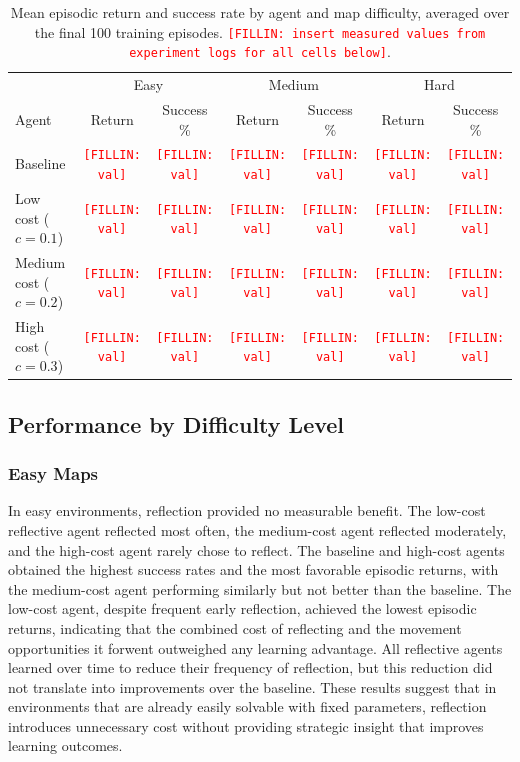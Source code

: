 \documentclass[11pt]{article}
\newcommand{\fillin}[1]{\textcolor{red}{\texttt{[FILLIN: #1]}}}
\begin{document}
\begin{table}[h]
\centering
\caption{Mean episodic return and success rate by agent and map difficulty, averaged over the final 100 training episodes. \fillin{insert measured values from experiment logs for all cells below}.}
\begin{tabular}{lcccccc}
\toprule
& \multicolumn{2}{c}{Easy} & \multicolumn{2}{c}{Medium} & \multicolumn{2}{c}{Hard} \\
Agent & Return & Success \% & Return & Success \% & Return & Success \% \\
\midrule
Baseline & \fillin{val} & \fillin{val} & \fillin{val} & \fillin{val} & \fillin{val} & \fillin{val} \\
Low cost ($c=0.1$) & \fillin{val} & \fillin{val} & \fillin{val} & \fillin{val} & \fillin{val} & \fillin{val} \\
Medium cost ($c=0.2$) & \fillin{val} & \fillin{val} & \fillin{val} & \fillin{val} & \fillin{val} & \fillin{val} \\
High cost ($c=0.3$) & \fillin{val} & \fillin{val} & \fillin{val} & \fillin{val} & \fillin{val} & \fillin{val} \\
\bottomrule
\end{tabular}
\end{table}

\subsection{Performance by Difficulty Level}

\subsubsection{Easy Maps}

In easy environments, reflection provided no measurable benefit. The low-cost reflective agent reflected most often, the medium-cost agent reflected moderately, and the high-cost agent rarely chose to reflect. The baseline and high-cost agents obtained the highest success rates and the most favorable episodic returns, with the medium-cost agent performing similarly but not better than the baseline. The low-cost agent, despite frequent early reflection, achieved the lowest episodic returns, indicating that the combined cost of reflecting and the movement opportunities it forwent outweighed any learning advantage. All reflective agents learned over time to reduce their frequency of reflection, but this reduction did not translate into improvements over the baseline. These results suggest that in environments that are already easily solvable with fixed parameters, reflection introduces unnecessary cost without providing strategic insight that improves learning outcomes.
\end{document}
